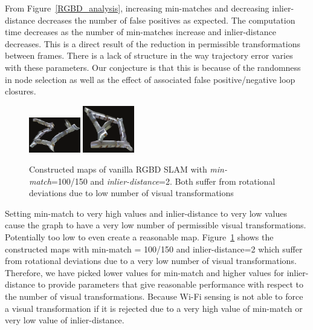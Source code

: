 From Figure~\ref{RGBD_analysis}, increasing min-matches and decreasing inlier-distance decreases the number of false positives as expected. 
The computation time decreases as the number of min-matches increase and inlier-distance decreases. This is a direct result of the reduction in permissible transformations between frames.
There is a lack of structure in the way trajectory error varies with these parameters. 
Our conjecture is that this is because of the randomness in node selection as well as the effect of associated false positive/negative loop closures. 

\begin{figure}
\centering
\includegraphics[width=0.2\textwidth]{Figure7_a.eps}
\includegraphics[width=0.2\textwidth]{Figure7_b.eps}
\caption{Constructed maps of vanilla RGBD SLAM with {\it min-match}=100/150 and {\it inlier-distance}=2. Both suffer from rotational deviations due to low number of visual transformations}
\label{fig:rgbd_badmap}
\end{figure}
\vspace{-10pt}
Setting {min-match} to very high values and {inlier-distance} to very low values cause the graph to have a very low number of permissible visual transformations. 
Potentially too low to even create a reasonable map. 
Figure~\ref{fig:rgbd_badmap} shows the constructed maps with {min-match} = 100/150 and {inlier-distance}=2 which suffer from rotational deviations due to a very low number of visual transformations. 
Therefore, we have picked lower values for {min-match} and higher values for {inlier-distance} to provide parameters that give reasonable performance with respect to the number of visual transformations. 
Because Wi-Fi sensing is not able to force a visual transformation if it is rejected due to a very high value of {min-match} or very low value of {inlier-distance}.
